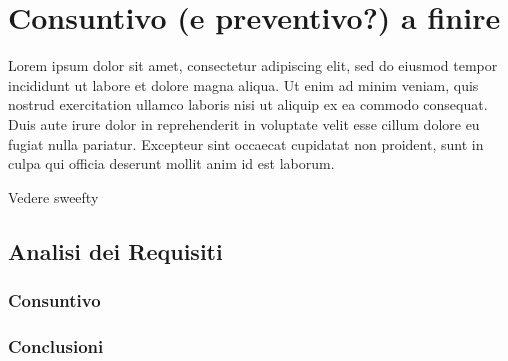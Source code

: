 \newpage
\section{Consuntivo (e preventivo?) a finire}

	Lorem ipsum dolor sit amet, consectetur adipiscing elit, sed do eiusmod tempor incididunt ut labore et dolore magna aliqua. Ut enim ad minim veniam, quis nostrud exercitation ullamco laboris nisi ut aliquip ex ea commodo consequat. Duis aute irure dolor in reprehenderit in voluptate velit esse cillum dolore eu fugiat nulla pariatur. Excepteur sint occaecat cupidatat non proident, sunt in culpa qui officia deserunt mollit anim id est laborum.

	Vedere sweefty
	
	\subsection{Analisi dei Requisiti}
		\subsubsection{Consuntivo}
		\subsubsection{Conclusioni}
	
	